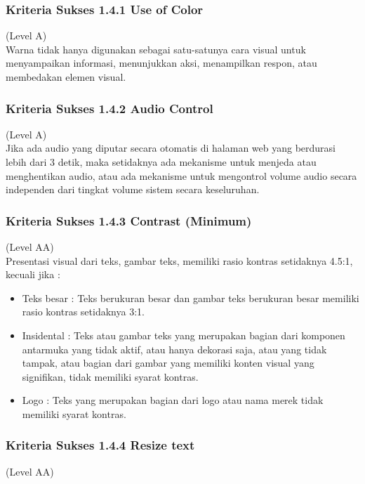 \documentclass[a4paper,twoside]{article}
\begin{document}
\begin{enumerate}
		\subsubsection*{Kriteria Sukses 1.4.1 Use of Color}
		\label{subsubsec:kriteria_1.4.1}
		(Level A) \\
		
		Warna tidak hanya digunakan sebagai satu-satunya cara visual untuk menyampaikan informasi, menunjukkan aksi, menampilkan respon, atau membedakan elemen visual.
		
		
		\subsubsection*{Kriteria Sukses 1.4.2 Audio Control}
		\label{subsubsec:kriteria_1.4.2}
		(Level A) \\
		
		Jika ada audio yang diputar secara otomatis di halaman web yang berdurasi lebih dari 3 detik, maka setidaknya ada mekanisme untuk menjeda atau menghentikan audio, atau ada mekanisme untuk mengontrol volume audio secara independen dari tingkat volume sistem secara keseluruhan.
		
		
		\subsubsection*{Kriteria Sukses 1.4.3 Contrast (Minimum)}
		\label{subsubsec:kriteria_1.4.3}
		(Level AA) \\
		
		Presentasi visual dari teks, gambar teks, memiliki rasio kontras setidaknya 4.5:1, kecuali jika :
		
		\begin{itemize}
			\item Teks besar : Teks berukuran besar dan gambar teks berukuran besar memiliki rasio kontras setidaknya 3:1.
			\item Insidental : Teks atau gambar teks yang merupakan bagian dari komponen antarmuka yang tidak aktif, atau hanya dekorasi saja, atau yang tidak tampak, atau bagian dari gambar yang memiliki konten visual yang signifikan, tidak memiliki syarat kontras.
			\item Logo : Teks yang merupakan bagian dari logo atau nama merek tidak memiliki syarat kontras.
		\end{itemize}
		
		\subsubsection*{Kriteria Sukses 1.4.4 Resize text}
		\label{subsubsec:kriteria_1.4.4}
		(Level AA) \\
		

\end{enumerate}
\end{document}
